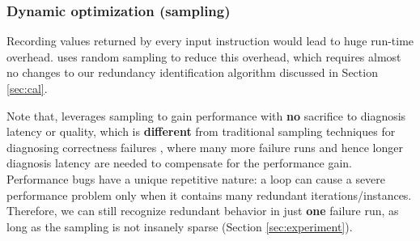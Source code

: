 
\subsubsection{Dynamic optimization (sampling)}
\label{sec:inst}


Recording values returned by every input instruction would lead to 
huge run-time overhead.
\Tool uses random sampling to reduce this overhead, which 
requires almost no changes to our redundancy 
identification algorithm discussed in Section \ref{sec:cal}.

Note that, \Tool leverages sampling to gain performance with \textbf{no}
sacrifice to diagnosis latency or quality, which is
\textbf{different} from traditional sampling techniques
for diagnosing correctness failures \cite{liblit03,liblit05}, where
many more failure runs and hence longer diagnosis latency
are needed to compensate for the performance gain.
Performance bugs have a unique repetitive nature:
a loop can cause a severe performance problem only when it 
contains many redundant iterations/instances.
Therefore, we can still recognize redundant behavior in just
\textbf{one} failure run, 
as long as the sampling is not insanely sparse
(Section \ref{sec:experiment}). 

